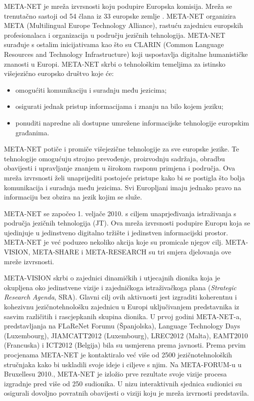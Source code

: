 \begin{multicols}{2}

META-NET je mreža izvrsnosti koju podupire Europska komisija. Mreža se trenutačno sastoji od 54 člana iz 33 europske zemlje \cite{art10}. META-NET organizira META (Multilingual Europe Technology Alliance), rastuću zajednicu europskih profesionalaca i organizacija u području jezičnih tehnologija. META-NET surađuje s ostalim inicijativama kao što su CLARIN (Common Language Resources and Technology Infrastructure) koji uspostavlja digitalne humanističke znanosti u Europi. META-NET skrbi o tehnološkim temeljima za istinsko višejezično europsko društvo koje će:

\begin{itemize}
\item omogućiti komunikaciju i suradnju među jezicima;
\item osigurati jednak pristup informacijama i znanju na bilo kojem jeziku;
\item ponuditi napredne ali dostupne umrežene informacijske tehnologije europskim građanima.
\end{itemize}

META-NET potiče i promiče višejezične tehnologije za sve europske jezike. Te tehnologije omogućuju strojno prevođenje, proizvodnju sadržaja, obradbu obavijesti i upravljanje znanjem u širokom rasponu primjena i područja. Ova mreža izvrsnosti želi unaprijediti postojeće pristupe kako bi se postigla što bolja komunikacija i suradnja među jezicima. Svi Europljani imaju jednako pravo na informaciju bez obzira na jezik kojim se služe.

META-NET se započeo 1. veljače 2010. s ciljem unaprjeđivanja istraživanja s područja jezičnih tehnologija (JT). Ova mreža izvrsnosti podupire Europu koja se ujedinjuje u jedinstveno digitalno tržište i jedinstven informacijski prostor. META-NET je već poduzeo nekoliko akcija koje su promicale njegov cilj. META-VISION, META-SHARE i META-RESEARCH su tri smjera djelovanja ove mreže izvrsnosti.

META-VISION skrbi o zajednici dinamičkih i utjecajnih dionika koja je okupljena oko jedinstvene vizije i zajedničkoga istraživačkoga plana (\emph{Strategic Research Agenda}, SRA). Glavni cilj ovih aktivnosti jest izgraditi koherentnu i kohezivnu jezičnotehnološku zajednicu u Europi uključivanjem predstavnika iz sasvim različitih i rascjepkanih skupina dionika. U prvoj godini META-NET-a, predstavljanja na FLaReNet Forumu (Španjolska), Language Technology Days (Luxembourg), JIAMCATT2012 (Luxembourg), LREC2012 (Malta), EAMT2010 (Francuska) i ICT2012 (Belgija) bila su usmjerena prema javnosti. Prema prvim procjenama META-NET je kontaktiralo već više od 2500 jezičnotehnoloških stručnjaka kako bi uskladili svoje ideje i ciljeve s njim. Na META-FORUM-u u Bruxellesu 2010., META-NET je izložio prve rezultate svoje vizije procesa izgradnje pred više od 250 sudionika. U nizu interaktivnih sjednica sudionici su osigurali dovoljno povratnih obavijesti o viziji koju je mreža izvrnosti predstavila.


\end{multicols}
